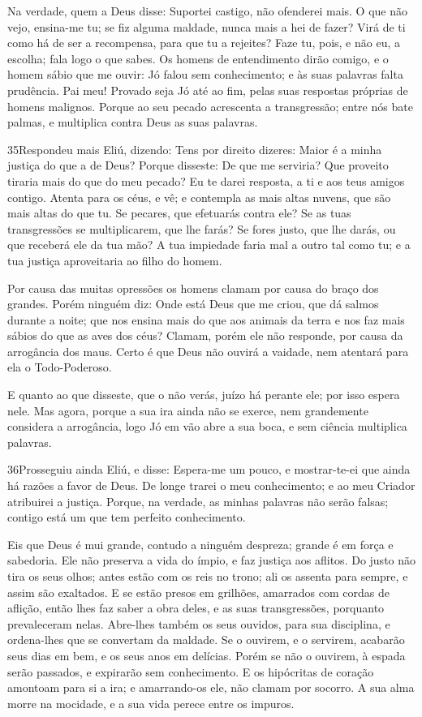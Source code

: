 Na verdade, quem a Deus disse: Suportei castigo, não ofenderei
mais. O que não vejo, ensina-me tu; se fiz alguma maldade,
nunca mais a hei de fazer? Virá de ti como há de ser a
recompensa, para que tu a rejeites? Faze tu, pois, e não eu, a
escolha; fala logo o que sabes. Os homens de entendimento
dirão comigo, e o homem sábio que me ouvir: Jó falou sem
conhecimento; e às suas palavras falta prudência. Pai meu!
Provado seja Jó até ao fim, pelas suas respostas próprias de homens
malignos. Porque ao seu pecado acrescenta a transgressão;
entre nós bate palmas, e multiplica contra Deus as suas palavras.

\medskip

\lettrine{35} Respondeu mais Eliú, dizendo: Tens por
direito dizeres: Maior é a minha justiça do que a de Deus?
Porque disseste: De que me serviria? Que proveito tiraria mais
do que do meu pecado? Eu te darei resposta, a ti e aos teus
amigos contigo. Atenta para os céus, e vê; e contempla as mais
altas nuvens, que são mais altas do que tu. Se pecares, que
efetuarás contra ele? Se as tuas transgressões se multiplicarem, que
lhe farás? Se fores justo, que lhe darás, ou que receberá ele da
tua mão? A tua impiedade faria mal a outro tal como tu; e a tua
justiça aproveitaria ao filho do homem.

Por causa das muitas opressões os homens clamam por causa do braço
dos grandes. Porém ninguém diz: Onde está Deus que me criou,
que dá salmos durante a noite; que nos ensina mais do que aos
animais da terra e nos faz mais sábios do que as aves dos céus?
Clamam, porém ele não responde, por causa da arrogância dos
maus. Certo é que Deus não ouvirá a vaidade, nem atentará
para ela o Todo-Poderoso.

E quanto ao que disseste, que o não verás, juízo há perante ele;
por isso espera nele. Mas agora, porque a sua ira ainda não
se exerce, nem grandemente considera a arrogância, logo Jó em
vão abre a sua boca, e sem ciência multiplica palavras.

\medskip

\lettrine{36} Prosseguiu ainda Eliú, e disse: Espera-me um
pouco, e mostrar-te-ei que ainda há razões a favor de Deus. De
longe trarei o meu conhecimento; e ao meu Criador atribuirei a
justiça. Porque, na verdade, as minhas palavras não serão
falsas; contigo está um que tem perfeito conhecimento.

Eis que Deus é mui grande, contudo a ninguém despreza; grande é em
força e sabedoria. Ele não preserva a vida do ímpio, e faz
justiça aos aflitos. Do justo não tira os seus olhos; antes
estão com os reis no trono; ali os assenta para sempre, e assim são
exaltados. E se estão presos em grilhões, amarrados com cordas
de aflição, então lhes faz saber a obra deles, e as suas
transgressões, porquanto prevaleceram nelas. Abre-lhes também
os seus ouvidos, para sua disciplina, e ordena-lhes que se convertam
da maldade. Se o ouvirem, e o servirem, acabarão seus dias em
bem, e os seus anos em delícias. Porém se não o ouvirem, à
espada serão passados, e expirarão sem conhecimento. E os
hipócritas de coração amontoam para si a ira; e amarrando-os ele,
não clamam por socorro. A sua alma morre na mocidade, e a sua
vida perece entre os impuros.

